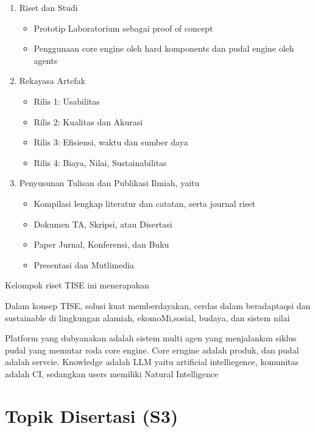 \documentclass[
  letterpaper,
  DIV=11,
  numbers=noendperiod]{scrreprt}
\providecommand{\tightlist}{%
  \setlength{\itemsep}{0pt}\setlength{\parskip}{0pt}}
\begin{document}
\begin{enumerate}
\def\labelenumi{\arabic{enumi}.}
\tightlist
\item
  Riset dan Studi

  \begin{itemize}
  \tightlist
  \item
    Prototip Laboratorium sebagai proof of concept
  \item
    Penggunaan core engine oleh hard komponents dan pudal engine oleh
    agents
  \end{itemize}
\item
  Rekayasa Artefak

  \begin{itemize}
  \tightlist
  \item
    Rilis 1: Usabilitas
  \item
    Rilis 2: Kualitas dan Akurasi
  \item
    Rilis 3: Efisiensi, waktu dan sumber daya
  \item
    Rilis 4: Biaya, Nilai, Sustainabilitas
  \end{itemize}
\item
  Penyusunan Tulisan dan Publikasi Ilmiah, yaitu

  \begin{itemize}
  \tightlist
  \item
    Kompilasi lengkap literatur dan catatan, serta journal riset
  \item
    Dokumen TA, Skripsi, atau Disertasi
  \item
    Paper Jurnal, Konferensi, dan Buku
  \item
    Presentasi dan Mutlimedia
  \end{itemize}
\end{enumerate}

Kelompok riset TISE ini menerapakan

Dalam konsep TISE, solusi kuat memberdayakan, cerdas dalam beradaptaqsi
dan sustainable di lingkungan alamiah, ekomoMi,sosial, budaya, dan
sistem nilai

Platform yang dubyanakan adalah sistem multi agen yang menjalankan
siklus pudal yang memutar roda core engine. Core erngine adalah produk,
dan pudal adalah servcie. Knowledge adalah LLM yaitu artificial
intelliegence, komunitas adalah CI, sedangkan users memiliki Natural
Intelligence


\chapter{Topik Disertasi (S3)}\label{topik-disertasi-s3}
\end{document}
